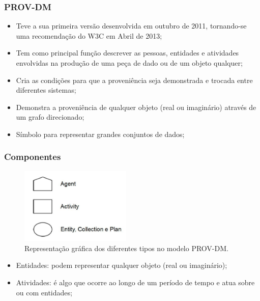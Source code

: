 \documentclass{beamer}
\begin{document}

\begin{frame}
\frametitle{PROV-DM}
\begin{itemize}
\item Teve a sua primeira vers\~ao desenvolvida em outubro de 2011,
  tornando-se uma recomenda\c{c}\~ao do W3C em Abril de 2013;
\item Tem como principal fun\c{c}\~ao descrever as pessoas, entidades
  e atividades envolvidas na produ\c{c}\~ao de uma pe\c{c}a de dado ou de
  um objeto qualquer;
\item Cria as condi\c{c}\~oes para que a proveni\^encia seja
  demonstrada e trocada entre diferentes sistemas;
\item Demonstra a proveni\^encia de qualquer objeto (real ou
  imagin\'ario) atrav\'es de um grafo direcionado;
\item S\'imbolo para representar grandes conjuntos de dados;
\end{itemize}
\end{frame}

\begin{frame}
\frametitle{Componentes}
\begin{figure}
\centering
\includegraphics[width=150pt]{images/componentesprovdm.png}
\caption{Representa\c{c}\~ao gr\'afica dos diferentes tipos no modelo
  PROV-DM. \cite{p5}}
\label{fig:entidadeprovdm}
\end{figure}
\begin{itemize}
\item Entidades: podem representar qualquer objeto (real ou
  imagin\'ario);
\item Atividades: \'e algo que ocorre ao longo de um per\'iodo de
  tempo e atua sobre ou com entidades;
\end{itemize}
\end{frame}
\end{document}
